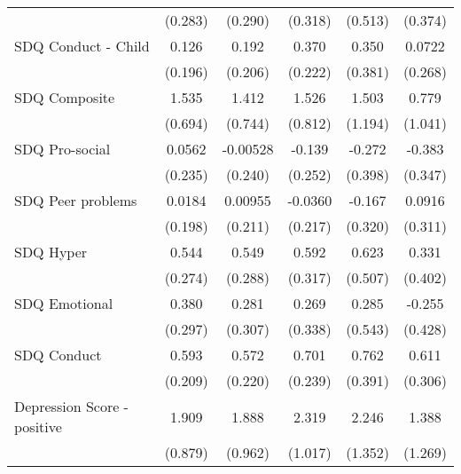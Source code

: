 {\begin{tabular}{l*{5}{c}}
            &     (0.283)         &     (0.290)         &     (0.318)         &     (0.513)         &     (0.374)         \\
\addlinespace
SDQ Conduct - Child&       0.126         &       0.192         &       0.370         &       0.350         &      0.0722         \\
            &     (0.196)         &     (0.206)         &     (0.222)         &     (0.381)         &     (0.268)         \\
\addlinespace
SDQ Composite&       1.535\sym{*}  &       1.412         &       1.526         &       1.503         &       0.779         \\
            &     (0.694)         &     (0.744)         &     (0.812)         &     (1.194)         &     (1.041)         \\
\addlinespace
SDQ Pro-social&      0.0562         &    -0.00528         &      -0.139         &      -0.272         &      -0.383         \\
            &     (0.235)         &     (0.240)         &     (0.252)         &     (0.398)         &     (0.347)         \\
\addlinespace
SDQ Peer problems&      0.0184         &     0.00955         &     -0.0360         &      -0.167         &      0.0916         \\
            &     (0.198)         &     (0.211)         &     (0.217)         &     (0.320)         &     (0.311)         \\
\addlinespace
SDQ Hyper   &       0.544\sym{*}  &       0.549         &       0.592         &       0.623         &       0.331         \\
            &     (0.274)         &     (0.288)         &     (0.317)         &     (0.507)         &     (0.402)         \\
\addlinespace
SDQ Emotional&       0.380         &       0.281         &       0.269         &       0.285         &      -0.255         \\
            &     (0.297)         &     (0.307)         &     (0.338)         &     (0.543)         &     (0.428)         \\
\addlinespace
SDQ Conduct &       0.593\sym{**} &       0.572\sym{**} &       0.701\sym{**} &       0.762         &       0.611\sym{*}  \\
            &     (0.209)         &     (0.220)         &     (0.239)         &     (0.391)         &     (0.306)         \\
\addlinespace
Depression Score - positive&       1.909\sym{*}  &       1.888\sym{*}  &       2.319\sym{*}  &       2.246         &       1.388         \\
            &     (0.879)         &     (0.962)         &     (1.017)         &     (1.352)         &     (1.269)         \\
\bottomrule
\end{tabular}
}
